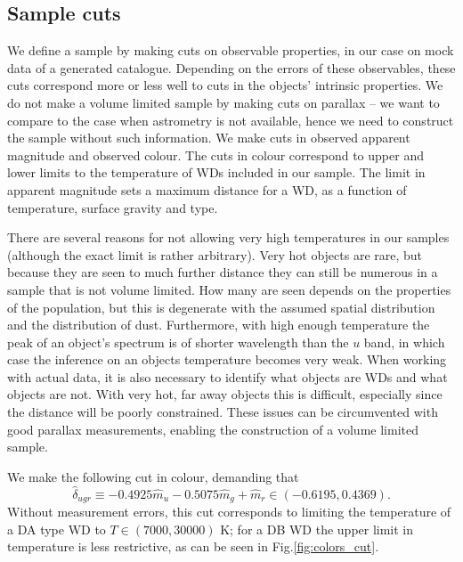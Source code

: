 \documentclass[fleqn,usenatbib]{mnras}
\newcommand{\Teff}{T}
\begin{document}
\subsection{Sample cuts}\label{sec:sample_cuts}

We define a sample by making cuts on observable properties, in our case on mock data of a generated catalogue. Depending on the errors of these observables, these cuts correspond more or less well to cuts in the objects' intrinsic properties. We do not make a volume limited sample by making cuts on parallax -- we want to compare to the case when astrometry is not available, hence we need to construct the sample without such information. We make cuts in observed apparent magnitude and observed colour. The cuts in colour correspond to upper and lower limits to the temperature of WDs included in our sample. The limit in apparent magnitude sets a maximum distance for a WD, as a function of temperature, surface gravity and type.

There are several reasons for not allowing very high temperatures in our samples (although the exact limit is rather arbitrary). Very hot objects are rare, but because they are seen to much further distance they can still be numerous in a sample that is not volume limited. How many are seen depends on the properties of the population, but this is degenerate with the assumed spatial distribution and the distribution of dust. Furthermore, with high enough temperature the peak of an object's spectrum is of shorter wavelength than the $u$ band, in which case the inference on an objects temperature becomes very weak. When working with actual data, it is also necessary to identify what objects are WDs and what objects are not. With very hot, far away objects this is difficult, especially since the distance will be poorly constrained. These issues can be circumvented with good parallax measurements, enabling the construction of a volume limited sample.

We make the following cut in colour, demanding that
\begin{equation}
	\hat{\delta}_{ugr} \equiv -0.4925\hat{m}_u-0.5075\hat{m}_g+\hat{m}_r \in (-0.6195,0.4369).
\end{equation}
Without measurement errors, this cut corresponds to limiting the temperature of a DA type WD to $\Teff \in (7000,30000)$ K; for a DB WD the upper limit in temperature is less restrictive, as can be seen in Fig.\ref{fig:colors_cut}.
\end{document}
